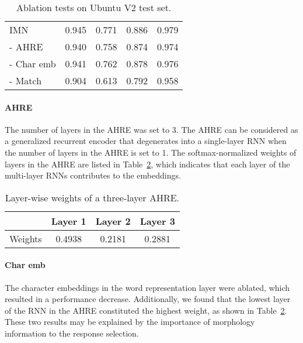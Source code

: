 \documentclass[sigconf]{acmart}
\begin{document}
    \begin{table}
     \small
     \caption{Ablation tests on Ubuntu V2 test set.}
     \centering
     \begin{tabular}{lcccc}
      \toprule
&  &  &  &  \\
      \midrule
       IMN                   & 0.945 & 0.771 & 0.886 & 0.979  \\
       - AHRE                & 0.940 & 0.758 & 0.874 & 0.974  \\
       - Char emb            & 0.941 & 0.762 & 0.878 & 0.976  \\
       - Match               & 0.904 & 0.613 & 0.792 & 0.958  \\
      \bottomrule
      \end{tabular}
      \label{tab4}
    \end{table}

    \paragraph{AHRE} The number of layers in the AHRE was set to 3. The AHRE can be considered as a generalized recurrent encoder that degenerates into a single-layer RNN when the number of layers in the AHRE is set to 1. The softmax-normalized weights of layers in the AHRE are listed in Table~\ref{tab5}, which indicates that each layer of the multi-layer RNNs contributes to the embeddings. 

    \begin{table}
\caption{Layer-wise weights of a three-layer AHRE.}
     \centering
     \begin{tabular}{lccc}
      \toprule
                  & Layer 1 & Layer 2 & Layer 3 \\
      \midrule
       Weights    & 0.4938  & 0.2181  & 0.2881  \\
      \bottomrule
      \end{tabular}
      \label{tab5}
    \end{table}

    \paragraph{Char emb} The character embeddings in the word representation layer were ablated, which resulted in a performance decrease. Additionally, we found that the lowest layer of the RNN in the AHRE constituted the highest weight, as shown in Table~\ref{tab5}. These two results may be explained by the importance of morphology information to the response selection.
\end{document}

